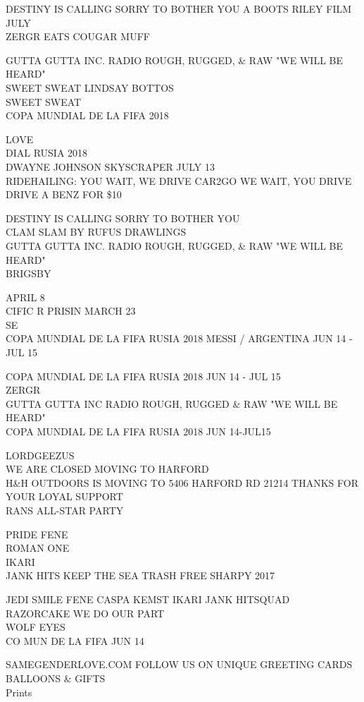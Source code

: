 \documentclass[10pt,letterpaper]{article}
\begin{document}
DESTINY IS CALLING SORRY TO BOTHER YOU A BOOTS RILEY FILM JULY\\
ZERGR EATS COUGAR MUFF

GUTTA GUTTA INC. RADIO ROUGH, RUGGED, \& RAW "WE WILL BE HEARD"\\
SWEET SWEAT LINDSAY BOTTOS\\
SWEET SWEAT\\
COPA MUNDIAL DE LA FIFA 2018

LOVE\\
DIAL RUSIA 2018\\
DWAYNE JOHNSON SKYSCRAPER JULY 13\\
RIDEHAILING: YOU WAIT, WE DRIVE CAR2GO WE WAIT, YOU DRIVE DRIVE A BENZ FOR \$10

DESTINY IS CALLING SORRY TO BOTHER YOU\\
CLAM SLAM BY RUFUS DRAWLINGS\\
GUTTA GUTTA INC. RADIO ROUGH, RUGGED, \& RAW "WE WILL BE HEARD"\\
BRIGSBY

APRIL 8\\
CIFIC R PRISIN MARCH 23\\
SE\\
COPA MUNDIAL DE LA FIFA RUSIA 2018 MESSI / ARGENTINA JUN 14 {-} JUL 15

COPA MUNDIAL DE LA FIFA RUSIA 2018 JUN 14 {-} JUL 15\\
ZERGR\\
GUTTA GUTTA INC RADIO ROUGH, RUGGED \& RAW "WE WILL BE HEARD"\\
COPA MUNDIAL DE LA FIFA RUSIA 2018 JUN 14{-}JUL15

LORDGEEZUS\\
WE ARE CLOSED MOVING TO HARFORD\\
H\&H OUTDOORS IS MOVING TO 5406 HARFORD RD 21214 THANKS FOR YOUR LOYAL SUPPORT\\
RANS ALL{-}STAR PARTY

PRIDE FENE\\
ROMAN ONE\\
IKARI\\
JANK HITS KEEP THE SEA TRASH FREE SHARPY 2017

JEDI SMILE FENE CASPA KEMST IKARI JANK HITSQUAD\\
RAZORCAKE WE DO OUR PART\\
WOLF EYES\\
CO MUN DE LA FIFA JUN 14

SAMEGENDERLOVE.COM FOLLOW US ON UNIQUE GREETING CARDS BALLOONS \& GIFTS\\
Prints
\end{document}
